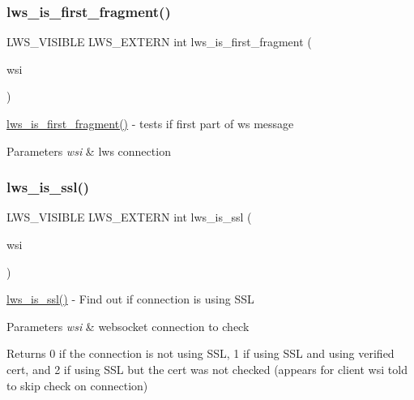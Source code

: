 \subsubsection{\texorpdfstring{lws\+\_\+is\+\_\+first\+\_\+fragment()}{lws\_is\_first\_fragment()}}
{\footnotesize\ttfamily L\+W\+S\+\_\+\+V\+I\+S\+I\+B\+LE L\+W\+S\+\_\+\+E\+X\+T\+E\+RN int lws\+\_\+is\+\_\+first\+\_\+fragment (\begin{DoxyParamCaption}\item[{struct \hyperlink{structlws}{lws} $\ast$}]{wsi }\end{DoxyParamCaption})}

\hyperlink{group__wsstatus_gaa931caf68b8efb5dc148ae94e54cbd51}{lws\+\_\+is\+\_\+first\+\_\+fragment()} -\/ tests if first part of ws message


\begin{DoxyParams}{Parameters}
{\em wsi} & lws connection \\
\hline
\end{DoxyParams}
\mbox{\label{group__wsstatus_ga26a140623d202dd2bf2004deb6994baa}} 
\subsubsection{\texorpdfstring{lws\+\_\+is\+\_\+ssl()}{lws\_is\_ssl()}}
{\footnotesize\ttfamily L\+W\+S\+\_\+\+V\+I\+S\+I\+B\+LE L\+W\+S\+\_\+\+E\+X\+T\+E\+RN int lws\+\_\+is\+\_\+ssl (\begin{DoxyParamCaption}\item[{struct \hyperlink{structlws}{lws} $\ast$}]{wsi }\end{DoxyParamCaption})}

\hyperlink{group__wsstatus_ga26a140623d202dd2bf2004deb6994baa}{lws\+\_\+is\+\_\+ssl()} -\/ Find out if connection is using S\+SL 
\begin{DoxyParams}{Parameters}
{\em wsi} & websocket connection to check\\
\hline
\end{DoxyParams}
Returns 0 if the connection is not using S\+SL, 1 if using S\+SL and using verified cert, and 2 if using S\+SL but the cert was not checked (appears for client wsi told to skip check on connection) \mbox{\label{group__wsstatus_gaeca4afc94b1f026034f99cbba37e2f85}} 
